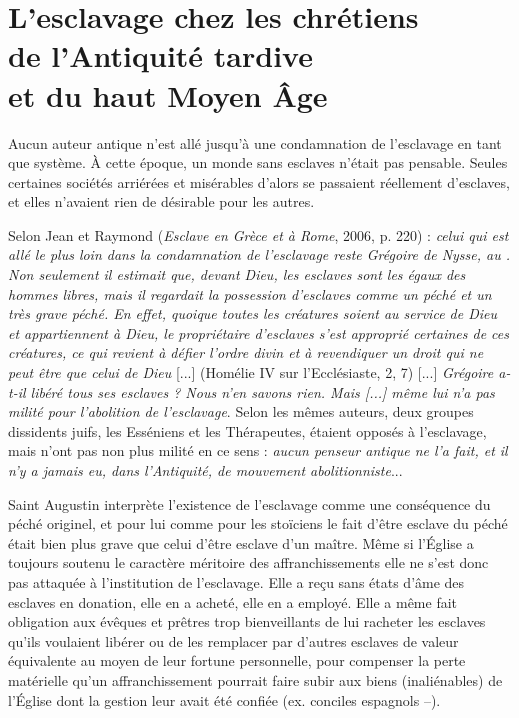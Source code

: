 

\chapter[L'esclavage chez les chrétiens de l'Antiquité tardive et du haut Moyen Âge]{L'esclavage chez les chrétiens\\de l'Antiquité tardive\\et du haut Moyen Âge}


 Aucun auteur antique n'est allé jusqu'à une condamnation de l'esclavage en tant que système. À cette époque, un monde sans esclaves n'était pas pensable. Seules certaines sociétés arriérées et misérables d'alors se passaient réellement d'esclaves, et elles n'avaient rien de désirable pour les autres. 

 Selon Jean  et Raymond  (\emph{Esclave en Grèce et à Rome}, 2006, p. 220) : \emph{celui qui est allé le plus loin dans la condamnation de l'esclavage reste Grégoire de Nysse, au . Non seulement il estimait que, devant Dieu, les esclaves sont les égaux des hommes libres, mais il regardait la possession d'esclaves comme un péché et un très grave péché. En effet, quoique toutes les créatures soient au service de Dieu et appartiennent à Dieu, le propriétaire d'esclaves s'est approprié certaines de ces créatures, ce qui revient à défier l'ordre divin et à revendiquer un droit qui ne peut être que celui de Dieu} [...] (Homélie IV sur l'Ecclésiaste, 2, 7) [...] \emph{Grégoire a-t-il libéré tous ses esclaves ? Nous n'en savons rien. Mais \emph{[...]} même lui n'a pas milité pour l'abolition de l'esclavage}. Selon les mêmes auteurs, deux groupes dissidents juifs, les Esséniens et les Thérapeutes, étaient opposés à l'esclavage, mais n'ont pas non plus milité en ce sens : \emph{aucun penseur antique ne l'a fait, et il n'y a jamais eu, dans l'Antiquité, de mouvement abolitionniste}...

 Saint Augustin interprète l'existence de l'esclavage comme une conséquence du péché originel, et pour lui comme pour les stoïciens le fait d'être esclave du péché était bien plus grave que celui d'être esclave d'un maître. Même si l'Église a toujours soutenu le caractère méritoire des affranchissements elle ne s'est donc pas attaquée à l'institution de l'esclavage. Elle a reçu sans états d'âme des esclaves en donation, elle en a acheté, elle en a employé. Elle a même fait obligation aux évêques et prêtres trop bienveillants de lui racheter les esclaves qu'ils voulaient libérer ou de les remplacer par d'autres esclaves de valeur équivalente au moyen de leur fortune personnelle, pour compenser la perte matérielle qu'un affranchissement pourrait faire subir aux biens (inaliénables) de l’Église dont la gestion leur avait été confiée (ex. conciles espagnols --). 

